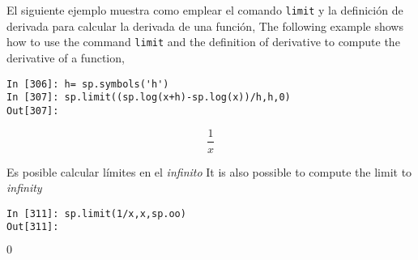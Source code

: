 \begin{paracol}{2}
El siguiente ejemplo muestra como emplear el comando \texttt{limit} y la definición de derivada para calcular la derivada de una función,
\switchcolumn
The following example shows how to use the command \texttt{limit} and the definition of derivative to compute the derivative of a function,
\end{paracol}
\begin{center}
	\begin{minipage}{.5\textwidth}
		\begin{verbatim}
In [306]: h= sp.symbols('h')
In [307]: sp.limit((sp.log(x+h)-sp.log(x))/h,h,0)
Out[307]: 
		\end{verbatim}
		{\noindent \begin{equation*}
			\frac{1}{x}	
		\end{equation*}}
		\end{minipage}
\end{center}
\begin{paracol}{2}
Es posible calcular límites en el \emph{infinito}
\switchcolumn
It is also possible to compute the limit to \emph{infinity}
\end{paracol}
\begin{center}
	\begin{minipage}{.8\textwidth}
		\begin{verbatim}
In [311]: sp.limit(1/x,x,sp.oo)
Out[311]:
		\end{verbatim}
		$0$
	\end{minipage}
\end{center}

